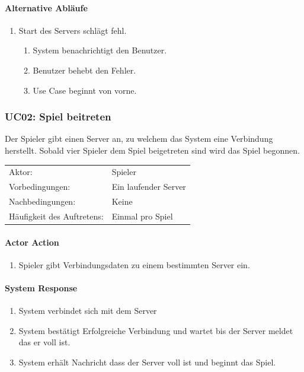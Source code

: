 \documentclass[a4paper,12pt,halfparskip,DIV14]{scrartcl}
\begin{document}
\paragraph{Alternative Abläufe}
\begin{enumerate}
	\item[2a] Start des Servers schlägt fehl.
	\begin{enumerate}
		\item System benachrichtigt den Benutzer.
		\item Benutzer behebt den Fehler.
		\item Use Case beginnt von vorne.
	\end{enumerate}
\end{enumerate}

\subsubsection{UC02: Spiel beitreten}\label{ssub:uc02_spiel_beitreten}
Der Spieler gibt einen Server an, zu welchem das System  eine Verbindung herstellt. Sobald vier Spieler dem Spiel beigetreten sind wird das Spiel begonnen.

\begin{tabular}{@{} l l @{}}
	Aktor:       								&	Spieler \\
	Vorbedingungen:							& Ein laufender Server \\
	Nachbedingungen:						& Keine \\
	Häufigkeit des Auftretens:	& Einmal pro Spiel \\
\end{tabular}
\begin{multicols}{2}
\raggedcolumns
\paragraph{Actor Action}
\begin{enumerate}
	\item[1] Spieler gibt Verbindungsdaten zu einem bestimmten Server ein.
\end{enumerate}
\columnbreak
\paragraph{System Response}
\begin{enumerate}
	\item[2] System verbindet sich mit dem Server
	\item[3] System bestätigt Erfolgreiche Verbindung und wartet bis der Server meldet das er voll ist.
	\item[4] System erhält Nachricht dass der Server voll ist und beginnt das Spiel.
\end{enumerate}
\end{multicols}
\end{document}

